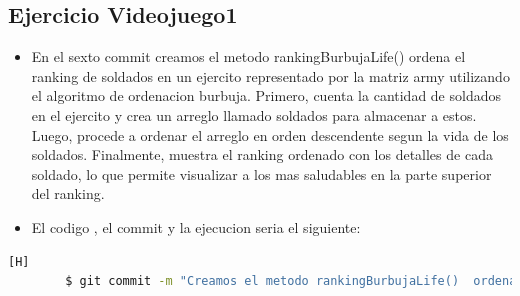 \documentclass{article}
\begin{document}
	\subsection{Ejercicio Videojuego1}
	\begin{itemize}	
		\item En el sexto commit creamos el metodo rankingBurbujaLife()  ordena el ranking de soldados en un ejercito representado por la matriz army utilizando el algoritmo de ordenacion burbuja. Primero, cuenta la cantidad de soldados en el ejercito y crea un arreglo llamado soldados para almacenar a estos. Luego, procede a ordenar el arreglo en orden descendente segun la vida de los soldados. Finalmente, muestra el ranking ordenado con los detalles de cada soldado, lo que permite visualizar a los mas saludables en la parte superior del ranking.
		\item El codigo , el commit y la ejecucion seria el siguiente:
	\end{itemize}	
	\begin{lstlisting}[language=bash,caption={Commit}][H]
		$ git commit -m "Creamos el metodo rankingBurbujaLife()  ordena el ranking de soldados en un ejercito representado por la matriz army utilizando el algoritmo de ordenacion burbuja. Primero, cuenta la cantidad de soldados en el ejercito y crea un arreglo llamado soldados para almacenar a estos. Luego, procede a ordenar el arreglo en orden descendente segun la vida de los soldados. Finalmente, muestra el ranking ordenado con los detalles de cada soldado, lo que permite visualizar a los mas saludables en la parte superior del ranking"
	\end{lstlisting}	
\end{document}
